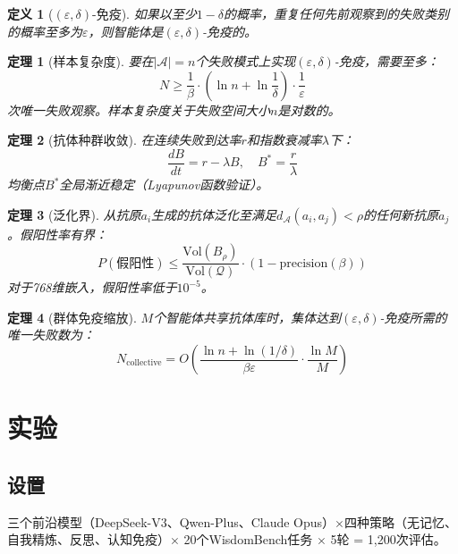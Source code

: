 \documentclass[11pt,a4paper]{article}
\newtheorem{theorem}{定理}
\newtheorem{definition}{定义}
\begin{document}
\begin{definition}[$(\varepsilon, \delta)$-免疫]
如果以至少$1-\delta$的概率，重复任何先前观察到的失败类别的概率至多为$\varepsilon$，则智能体是$(\varepsilon, \delta)$-免疫的。
\end{definition}

\begin{theorem}[样本复杂度]
要在$|\mathcal{A}|=n$个失败模式上实现$(\varepsilon,\delta)$-免疫，需要至多：
\begin{equation}
  N \geq \frac{1}{\beta} \cdot \left(\ln n + \ln \frac{1}{\delta}\right) \cdot \frac{1}{\varepsilon}
\end{equation}
次唯一失败观察。样本复杂度关于失败空间大小$n$是\emph{对数}的。
\end{theorem}

\begin{theorem}[抗体种群收敛]
在连续失败到达率$r$和指数衰减率$\lambda$下：
\begin{equation}
  \frac{dB}{dt} = r - \lambda B, \quad B^* = \frac{r}{\lambda}
\end{equation}
均衡点$B^*$全局渐近稳定（Lyapunov函数验证）。
\end{theorem}

\begin{theorem}[泛化界]
从抗原$a_i$生成的抗体泛化至满足$d_{\mathcal{A}}(a_i, a_j) < \rho$的任何新抗原$a_j$。假阳性率有界：
\begin{equation}
  P(\text{假阳性}) \leq \frac{\text{Vol}(B_\rho)}{\text{Vol}(\mathcal{Q})} \cdot (1 - \text{precision}(\beta))
\end{equation}
对于768维嵌入，假阳性率低于$10^{-5}$。
\end{theorem}

\begin{theorem}[群体免疫缩放]
$M$个智能体共享抗体库时，集体达到$(\varepsilon,\delta)$-免疫所需的唯一失败数为：
\begin{equation}
  N_{\text{collective}} = O\left(\frac{\ln n + \ln(1/\delta)}{\beta\varepsilon} \cdot \frac{\ln M}{M}\right)
\end{equation}
\end{theorem}

\section{实验}

\subsection{设置}
三个前沿模型（DeepSeek-V3、Qwen-Plus、Claude Opus）$\times$四种策略（无记忆、自我精炼、反思、认知免疫）$\times$ 20个WisdomBench任务 $\times$ 5轮 = 1,200次评估。
\end{document}
